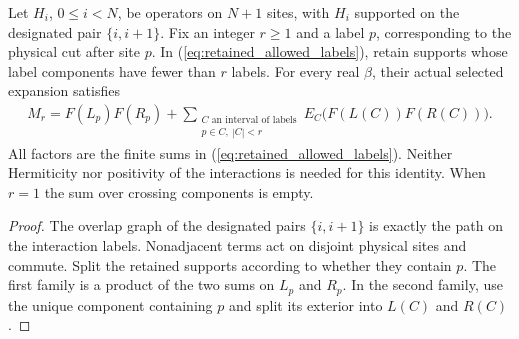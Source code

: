 \begin{lemma}
    \label{thm:physical_cluster_crossing_decomposition}
    \leanok
    Let $H_i$, $0\leq i<N$, be operators on $N+1$ sites, with
    $H_i$ supported on the designated pair $\{i,i+1\}$. Fix an integer
    $r\geq1$ and a label $p$, corresponding to the physical cut after
    site $p$. In (\ref{eq:retained_allowed_labels}), retain supports
    whose label components have fewer than $r$ labels. For every real
    $\beta$, their actual selected expansion satisfies
    \begin{align}
        M_r=F(L_p)F(R_p)+
        \sum_{\substack{C\text{ an interval of labels} \\p\in C,\ |C|<r}}
        E_C\bigl(F(L(C))F(R(C))\bigr).
        \label{eq:physical_cluster_crossing_decomposition}
    \end{align}
    All factors are the finite sums in
    (\ref{eq:retained_allowed_labels}). Neither Hermiticity nor
    positivity of the interactions is needed for this identity.
    When $r=1$ the sum over crossing components is empty.
\end{lemma}
\begin{proof}\leanok
    The overlap graph of the designated pairs $\{i,i+1\}$ is exactly
    the path on the interaction labels. Nonadjacent terms act on
    disjoint physical sites and commute. Split the retained supports
    according to whether they contain $p$. The first family is a
    product of the two sums on $L_p$ and $R_p$. In the second family,
    use the unique component containing $p$ and split its exterior
    into $L(C)$ and $R(C)$.
\end{proof}

